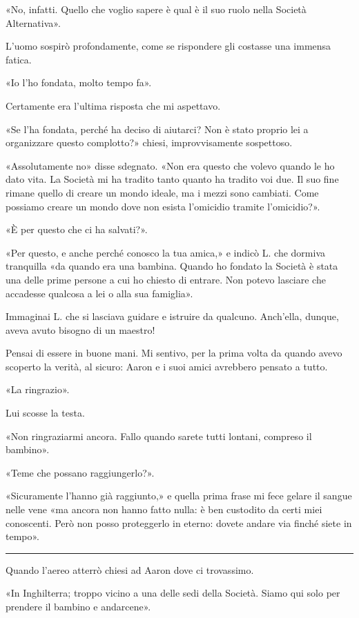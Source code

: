 \documentclass[a4paper,10pt]{memoir}
\begin{document}
«No, infatti. Quello che voglio sapere è qual è il suo ruolo nella Società Alternativa».

L'uomo sospirò profondamente, come se rispondere gli costasse una immensa fatica.

«Io l'ho fondata, molto tempo fa».

Certamente era l'ultima risposta che mi aspettavo.

«Se l'ha fondata, perché ha deciso di aiutarci? Non è stato proprio lei a organizzare questo complotto?» chiesi,
improvvisamente sospettoso.

«Assolutamente no» disse sdegnato. «Non era questo che volevo quando le ho dato vita. La Società mi ha tradito tanto
quanto ha tradito voi due. Il suo fine rimane quello di creare un mondo ideale, ma i mezzi sono cambiati. Come possiamo
creare un mondo dove non esista l'omicidio tramite l'omicidio?».

«È per questo che ci ha salvati?».

«Per questo, e anche perché conosco la tua amica,» e indicò L. che dormiva tranquilla «da quando era una bambina. Quando
ho fondato la Società è stata una delle prime persone a cui ho chiesto di entrare. Non potevo lasciare che accadesse
qualcosa a lei o alla sua famiglia».

Immaginai L. che si lasciava guidare e istruire da qualcuno. Anch'ella, dunque, aveva avuto bisogno di un maestro!

Pensai di essere in buone mani. Mi sentivo, per la prima volta da quando avevo scoperto la verità, al sicuro: Aaron e i
suoi amici avrebbero pensato a tutto.

«La ringrazio».

Lui scosse la testa.

«Non ringraziarmi ancora. Fallo quando sarete tutti lontani, compreso il bambino».

«Teme che possano raggiungerlo?».

«Sicuramente l'hanno già raggiunto,» e quella prima frase mi fece gelare il sangue nelle vene «ma ancora non hanno fatto
nulla: è ben custodito da certi miei conoscenti. Però non posso proteggerlo in eterno: dovete andare via finché siete in
tempo».

\plainbreak{1}

Quando l'aereo atterrò chiesi ad Aaron dove ci trovassimo.

«In Inghilterra; troppo vicino a una delle sedi della Società. Siamo qui solo per prendere il bambino e andarcene».
\end{document}
